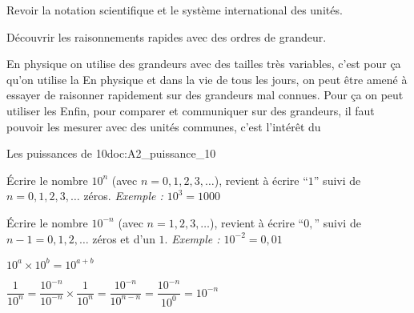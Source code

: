 \teteSndMeth
\vspace*{-30pt}

\begin{objectifs}
  \item Revoir la notation scientifique et le système international des unités.
  \item Découvrir les raisonnements rapides avec des ordres de grandeur.
\end{objectifs}

\begin{contexte}
  En physique on utilise des grandeurs avec des tailles très variables, c'est pour ça qu'on utilise la 
  En physique et dans la vie de tous les jours, on peut être amené à essayer de raisonner rapidement sur des grandeurs mal connues. Pour ça on peut utiliser les 
  Enfin, pour comparer et communiquer sur des grandeurs, il faut pouvoir les mesurer avec des unités communes, c'est l'intérêt du 
\end{contexte}


\vspace*{-12pt}

\begin{doc}{Les puissances de 10}{doc:A2_puissance_10}
  \begin{importants}
  \begin{listePoints}
    \item Écrire le nombre $10^n$ (avec $n = 0, 1, 2, 3, \ldots$), revient à écrire ``$1$'' suivi de $n = 0, 1, 2, 3, \ldots$ zéros. \textit{Exemple : $10^3 = 1000$}
    \item Écrire le nombre $10^{-n}$ (avec $n = 1, 2, 3, \ldots$), revient à écrire ``$0,$'' suivi de $n - 1 = 0, 1, 2, \ldots$ zéros et d'un $1$. \textit{Exemple : $10^{-2} = 0,\!01$}
    \item $10^a \times 10^b = 10^{a + b}$
    \item $\dfrac{1}{10^n} 
    = \dfrac{10^{-n}}{10^{-n}} \times \dfrac{1}{10^n} 
    = \dfrac{10^{-n}}{10^{n - n}}
    = \dfrac{10^{-n}}{10^0}
    = 10^{-n}$
  \end{listePoints}
  \end{importants}
\end{doc}

